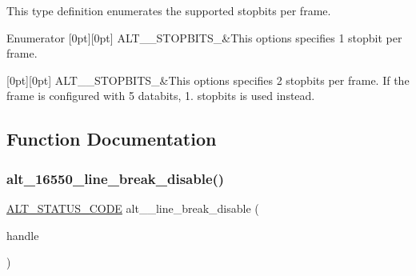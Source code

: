 This type definition enumerates the supported stopbits per frame. \begin{DoxyEnumFields}{Enumerator}
[0pt][0pt]{}\mbox{\label{group__UART__LINE_gga737333dc2e06f30e344ca799a37c91b8a2f51c01895d553e022a2046f02eae7fe}} 
A\+L\+T\+\_\+\_\+\+S\+T\+O\+P\+B\+I\+T\+S\+\_&This options specifies 1 stopbit per frame. \\
\hline

[0pt][0pt]{}\mbox{\label{group__UART__LINE_gga737333dc2e06f30e344ca799a37c91b8a231116c8c18bbf327691ce9a502ad652}} 
A\+L\+T\+\_\+\_\+\+S\+T\+O\+P\+B\+I\+T\+S\+\_&This options specifies 2 stopbits per frame. If the frame is configured with 5 databits, 1. stopbits is used instead. \\
\hline

\end{DoxyEnumFields}


\subsection{Function Documentation}
\mbox{\label{group__UART__LINE_ga448e8d9d2c31756d7ce766b2aa5e2f91}} 
\subsubsection{\texorpdfstring{alt\_16550\_line\_break\_disable()}{alt\_16550\_line\_break\_disable()}}
{\footnotesize\ttfamily \mbox{\hyperlink{hwlib_8h_abdb0d369f069723ca55d6c94bcaaaa12}{A\+L\+T\+\_\+\+S\+T\+A\+T\+U\+S\+\_\+\+C\+O\+DE}} alt\+\_\+\_\+line\+\_\+break\+\_\+disable (\begin{DoxyParamCaption}\item[{\mbox{\hyperlink{group__UART__BASIC_ga4173f362f19fc04032c3859b78d78119}{A\+L\+T\+\_\+16550\+\_\+\+H\+A\+N\+D\+L\+E\+\_\+t}} $\ast$}]{handle }\end{DoxyParamCaption})}

